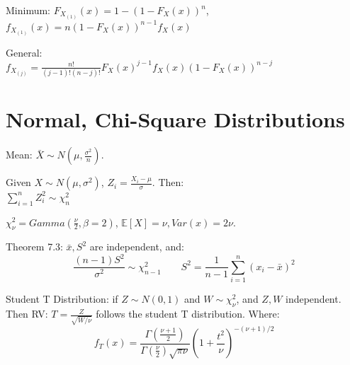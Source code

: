\documentclass[10pt]{article}
\begin{document}
Minimum:
$F_{X_{(1)}}(x) = 1 - (1 - F_X(x))^n$, \\
$f_{X_{(1)}}(x) = n (1 - F_X(x)) ^ {n-1} f_X(x)$

General:\\
$f_{X_{(j)}} = \frac{n!}{(j-1)!(n-j)!}F_X(x)^{j-1}f_X(x)(1-F_X(x))^{n-j}$


\section{Normal, Chi-Square Distributions}
Mean: $\bar{X} \sim N(\mu, \frac{\sigma^2}{n})$.

Given $X \sim N(\mu, \sigma^2)$, $Z_i = \frac{X_i - \mu}{\sigma}$. Then:\\
$\sum_{i=1}^n Z_i^2 \sim \chi^2_n$

$\chi^2_\nu = Gamma(\frac{\nu}{2}, \beta=2)$, $\mathbb{E}[X] = \nu, Var(x) = 2\nu$.

Theorem 7.3: $\bar{x}, S^2$ are independent, and:
$$\frac{(n - 1)S^2}{\sigma^2} \sim \chi^2_{n-1} \quad \quad S^2 = \frac{1}{n-1} \sum_{i=1}^n (x_i - \bar{x})^2$$

Student T Distribution: if $Z \sim N(0, 1)$ and $W \sim \chi^2_\nu$, and $Z, W$ independent. Then RV:
$T = \frac{Z}{\sqrt{W / \nu}}$ follows the student T distribution. Where:\\
$$f_T(x) = \frac{\Gamma(\frac{\nu + 1}{2})}{\Gamma(\frac{\nu}{2}) \sqrt{\pi \nu}}(1 + \frac{t^2}{\nu})^{-(\nu + 1)/2}$$
\end{document}
